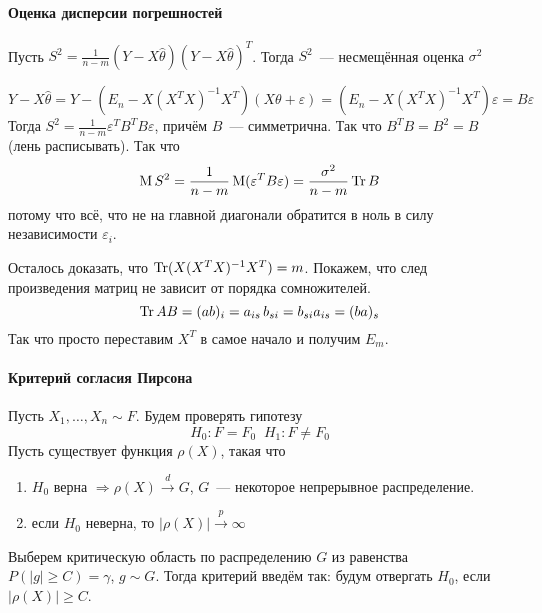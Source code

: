 \documentclass[12pt,timbord]{../../../notes}
\begin{document}
\paragraph{Оценка дисперсии погрешностей}
\label{par:stat::estdispLSM}

\begin{thrm}\label{thrm:stat::estdispLSM::est}
  Пусть $\displaystyle S^2 = \frac{1}{n-m} (Y - X \hat \theta) ( Y - X \hat\theta)^T$. Тогда
  $S^2$~--- несмещённая оценка $\sigma^2$
\end{thrm}
\begin{ittproof}
  \[
    Y - X\hat\theta = Y -  (E_n - X (X^T X)^{-1} X^T ) (X\theta + \varepsilon) = (E_n - X (X^T X)^{-1} X^T
    ) \varepsilon = B \varepsilon
  \]
  Тогда $S^2 = \frac{1}{n-m} \varepsilon^T B^T B \varepsilon$, причём $B$~--- симметрична. Так
  что $B^TB =B^2 = B$ (лень расписывать). Так что 
  \[
    \operatorname{M} S^2 = \frac{1}{n-m} \operatorname{M} (\varepsilon^T B \varepsilon)  = \frac{\sigma^2}{n-m} \operatorname{Tr} B
  \]
  потому что всё, что не на главной диагонали обратится в ноль в силу независимости
  $\varepsilon_i$.

  Осталось доказать, что $\operatorname{Tr} (X (X^T X)^{-1} X^T) = m$. Покажем, что след произведения матриц не
  зависит от порядка сомножителей. 
  \[
    \operatorname{Tr} AB = (ab)_i =  a_{is}\, b_{si} = b_{si} a_{is} = (ba)_s
  \]
  Так что просто переставим $X^T$ в самое начало и получим $E_m$.
\end{ittproof}

\paragraph{Критерий согласия Пирсона}
\label{par:stat::pirson}

\begin{defn}\label{defn:stat::pirson}
  Пусть $X_1, \dotsc, X_n \sim F$. Будем проверять гипотезу \[
  H_0\colon F = F_0 \;\;
  H_1\colon F \neq F_0
\]
Пусть существует функция $\rho(X)$, такая что
\begin{enumerate}
  \item $H_0$ верна $ \Rightarrow \rho(X) \xrightarrow{d} G$, $G$~--- некоторое непрерывное
    распределение.
  \item если $H_0$ неверна, то $|\rho(X)| \xrightarrow{p} \infty$
\end{enumerate}

Выберем критическую область по распределению $G$ из равенства $P(|g| \geqslant C) = \gamma$, $g \sim G$.
Тогда критерий введём так: будум отвергать $H_0$, если $|\rho(X)| \geqslant C$. 
\end{defn}
\end{document}
